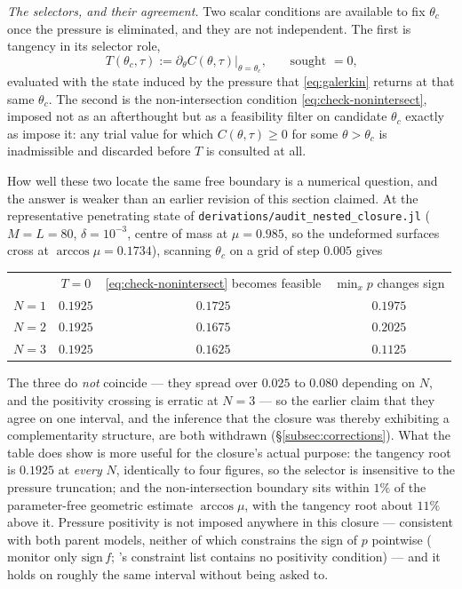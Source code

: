 \emph{The selectors, and their agreement.} Two scalar conditions are available to fix $\theta_c$ once the pressure is eliminated, and they are not independent. The first is tangency in its selector role,
\begin{equation}
    T(\theta_c,\tau) := \partial_\theta C(\theta,\tau)\big|_{\theta=\theta_c}\text{,}\qquad\text{sought }=0\text{,}
    \label{eq:tangency-selector}
\end{equation}
evaluated with the state induced by the pressure that \eqref{eq:galerkin} returns at that same $\theta_c$. The second is the non-intersection condition \eqref{eq:check-nonintersect}, imposed not as an afterthought but as a feasibility filter on candidate $\theta_c$ exactly as \cite{AgueroEtAl2026} impose it: any trial value for which $C(\theta,\tau)\ge0$ for some $\theta>\theta_c$ is inadmissible and discarded before $T$ is consulted at all.

How well these two locate the same free boundary is a numerical question, and the answer is weaker than an earlier revision of this section claimed. At the representative penetrating state of \texttt{derivations/audit\_nested\_closure.jl} ($M=L=80$, $\delta=10^{-3}$, centre of mass at $\mu=0.985$, so the undeformed surfaces cross at $\arccos\mu=0.1734$), scanning $\theta_c$ on a grid of step $0.005$ gives
\begin{center}
\begin{tabular}{lccc}
 & $T=0$ & \eqref{eq:check-nonintersect} becomes feasible & $\min_xp$ changes sign \\
$N=1$ & $0.1925$ & $0.1725$ & $0.1975$ \\
$N=2$ & $0.1925$ & $0.1675$ & $0.2025$ \\
$N=3$ & $0.1925$ & $0.1625$ & $0.1125$
\end{tabular}
\end{center}
The three do \emph{not} coincide --- they spread over $0.025$ to $0.080$ depending on $N$, and the positivity crossing is erratic at $N=3$ --- so the earlier claim that they agree on one interval, and the inference that the closure was thereby exhibiting a complementarity structure, are both withdrawn (\S\ref{subsec:corrections}). What the table does show is more useful for the closure's actual purpose: the tangency root is $0.1925$ at \emph{every} $N$, identically to four figures, so the selector is insensitive to the pressure truncation; and the non-intersection boundary sits within $1\%$ of the parameter-free geometric estimate $\arccos\mu$, with the tangency root about $11\%$ above it. Pressure positivity is not imposed anywhere in this closure --- consistent with both parent models, neither of which constrains the sign of $p$ pointwise (\cite{AlventosaEtAl2023} monitor only $\mathrm{sign}\,f$; \cite{AgueroEtAl2026}'s constraint list contains no positivity condition) --- and it holds on roughly the same interval without being asked to.


